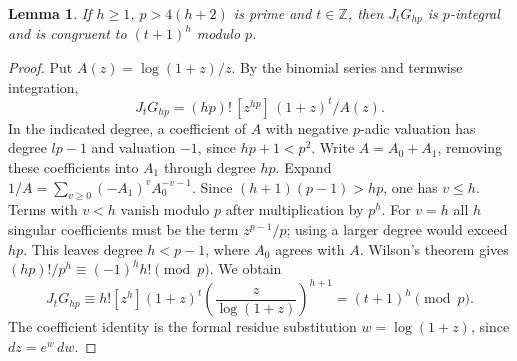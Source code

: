 \documentclass[11pt,a4paper,oneside,openany]{report}
\newtheorem{lemma}[theorem]{Lemma}\newtheorem{proposition}[theorem]{Proposition}
\theoremstyle{remark}\newtheorem{remark}[theorem]{Remark}
\numberwithin{equation}{section}
\begin{document}
\begin{lemma}\label{ch6:lem:cauchyprimeblock}
If $h\ge1$, $p>4(h+2)$ is prime and $t\in\mathbb Z$, then $J_tG_{hp}$ is $p$-integral and is congruent to $(t+1)^h$ modulo $p$.
\end{lemma}
\begin{proof}
Put $A(z)=\log(1+z)/z$. By the binomial series and termwise integration,
\[
 J_tG_{hp}=(hp)!\,[z^{hp}]\,(1+z)^t/A(z).
\]
In the indicated degree, a coefficient of $A$ with negative $p$-adic valuation has degree $lp-1$ and valuation $-1$, since $hp+1<p^2$. Write $A=A_0+A_1$, removing these coefficients into $A_1$ through degree $hp$. Expand $1/A=\sum_{v\ge0}(-A_1)^v A_0^{-v-1}$. Since $(h+1)(p-1)>hp$, one has $v\le h$. Terms with $v<h$ vanish modulo $p$ after multiplication by $p^h$. For $v=h$ all $h$ singular coefficients must be the term $z^{p-1}/p$; using a larger degree would exceed $hp$. This leaves degree $h<p-1$, where $A_0$ agrees with $A$. Wilson's theorem gives $(hp)!/p^h\equiv(-1)^h h!\pmod p$. We obtain
\[
 J_tG_{hp}\equiv h![z^h](1+z)^t\left(\frac{z}{\log(1+z)}\right)^{h+1}=(t+1)^h\pmod p.
\]
The coefficient identity is the formal residue substitution $w=\log(1+z)$, since $dz=e^w\,dw$.
\end{proof}
\end{document}
